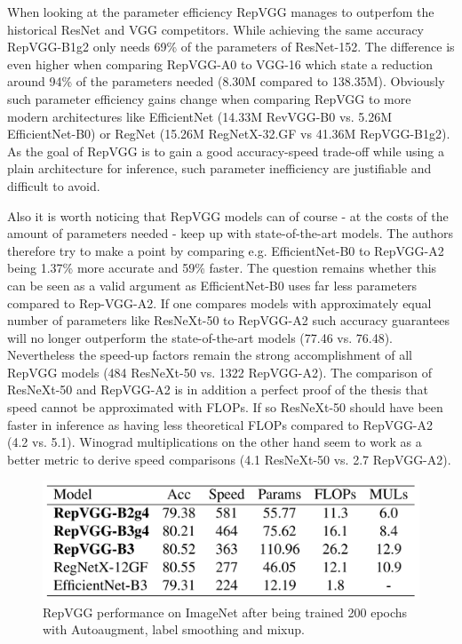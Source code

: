 When looking at the parameter efficiency RepVGG manages to outperfom the historical ResNet and VGG competitors. While achieving the same accuracy RepVGG-B1g2 only needs 69\% of the parameters of ResNet-152. The difference is even higher when comparing RepVGG-A0 to VGG-16 which state a reduction around 94\% of the parameters needed (8.30M compared to 138.35M). Obviously such parameter efficiency gains change when comparing RepVGG to more modern architectures like EfficientNet (14.33M RevVGG-B0 vs. 5.26M EfficientNet-B0) or RegNet (15.26M RegNetX-32.GF vs 41.36M RepVGG-B1g2). As the goal of RepVGG is to gain a good accuracy-speed trade-off while using a plain architecture for inference, such parameter inefficiency are justifiable and difficult to avoid. 

Also it is worth noticing that RepVGG models can of course - at the costs of the amount of parameters needed - keep up with state-of-the-art models. The authors therefore try to make a point by comparing e.g. EfficientNet-B0 to RepVGG-A2 being 1.37\% more accurate and 59\% faster. The question remains whether this can be seen as a valid argument as EfficientNet-B0 uses far less parameters compared to Rep-VGG-A2. If one compares models with approximately equal number of parameters like ResNeXt-50 to RepVGG-A2 such accuracy guarantees will no longer outperform the state-of-the-art models (77.46 vs. 76.48). Nevertheless the speed-up factors remain the strong accomplishment of all RepVGG models (484 ResNeXt-50 vs. 1322 RepVGG-A2). The comparison of ResNeXt-50 and RepVGG-A2 is in addition a perfect proof of the thesis that speed cannot be approximated with FLOPs. If so ResNeXt-50 should have been faster in inference as having less theoretical FLOPs compared to RepVGG-A2 (4.2 vs. 5.1). Winograd multiplications on the other hand seem to work as a better metric to derive speed comparisons (4.1 ResNeXt-50 vs. 2.7 RepVGG-A2). 

\begin{figure}[t]
	\begin{center}
		\includegraphics[width=0.8\linewidth]{images/results2.PNG}
	\end{center}
	\caption{RepVGG performance on ImageNet after being trained 200 epochs with Autoaugment, label smoothing and mixup.}
	\label{fig:results2}
\end{figure}

